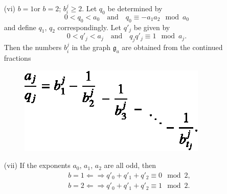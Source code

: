 \begin{theorem*}
\begin{itemize}
\item[\rm(vi)] $b=1$\pageoriginale or $b=2$; $b^{j}_{i}\geq 2$. Let $q_{0}$ be determined by
$$
0<q_{0}<a_{0}\quad\text{and}\quad q_{0}\equiv - a_{1}a_{2}\mod a_{0}
$$
and define $q_{1}$, $q_{2}$ correspondingly. Let $q'_{j}$ be given by
$$
0<q'_{j}<a_{j}\text{~~ and~~ } q_{j}q'_{j}\equiv 1\mod a_{j}.
$$
Then the numbers $b^{j}_{i}$ in the graph $\mathfrak{g}_{a}$ are obtained from the continued fractions
\begin{figure}[H]
\centering
\includegraphics{figures/fig10.eps}
\end{figure}

\item[\rm(vii)] If the exponents $a_{0}$, $a_{1}$, $a_{2}$ are all odd, then
\begin{align*}
& b=1\Leftarrow \Rightarrow q'_{0}+q'_{1}+q'_{2}\equiv 0\mod 2,\\
& b=2\Leftarrow \Rightarrow q'_{0}+q'_{1}+q'_{2}\equiv 1\mod 2.
\end{align*}
\end{itemize}
\end{theorem*}

